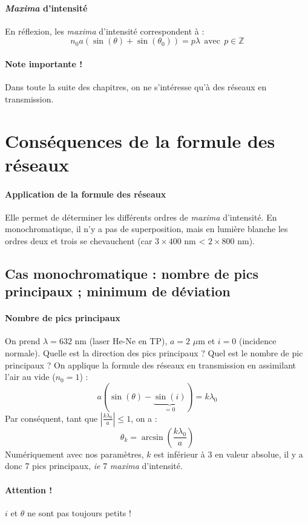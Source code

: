 \documentclass[french]{book}
\theoremstyle{plain}
\theoremstyle{definition}
\theoremstyle{remark}
\newcommand{\Z}{\mathbb{Z}}
\begin{document}
\paragraph{\textit{Maxima} d'intensité} En réflexion, les \textit{maxima} d'intensité correspondent à :$$n_0a(\sin(\theta)+\sin(\theta_0))=p\lambda \ \ \text{avec}\ \ p\in\Z$$
\paragraph{Note importante !} Dans toute la suite des chapitres, on ne s'intéresse qu'à des réseaux en transmission.
\section{Conséquences de la formule des réseaux}
\paragraph{Application de la formule des réseaux} Elle permet de déterminer les différents ordres de \textit{maxima} d’intensité. En monochromatique, il n’y a pas de superposition, mais en lumière blanche les ordres deux et trois se chevauchent (car $3\times 400$ nm < $2\times 800$ nm).
\subsection{Cas monochromatique : nombre de pics principaux ; minimum de déviation}
\paragraph{Nombre de pics principaux} On prend $\lambda=632$ nm (laser He-Ne en TP), $a=2$ $\mu$m et $i=0$ (incidence normale). Quelle est la direction des pics principaux ? Quel est le nombre de pic principaux ? On applique la formule des réseaux en transmission en assimilant l'air au vide ($n_0=1$) : $$a\left(\sin(\theta)-\underbrace{\sin(i)}_{=0}\right)=k\lambda_0$$ Par conséquent, tant que $\displaystyle\left\lvert\frac{k\lambda_0}{a}\right\rvert\leqslant 1$, on a : $$\theta_k=\arcsin\left(\frac{k\lambda_0}{a}\right)$$ Numériquement avec nos paramètres, $k$ est inférieur à 3 en valeur absolue, il y a donc 7 pics principaux, \textit{ie} 7 \textit{maxima} d'intensité.
\paragraph{Attention !} $i$ et $\theta$ ne sont pas toujours petits !
\end{document}
